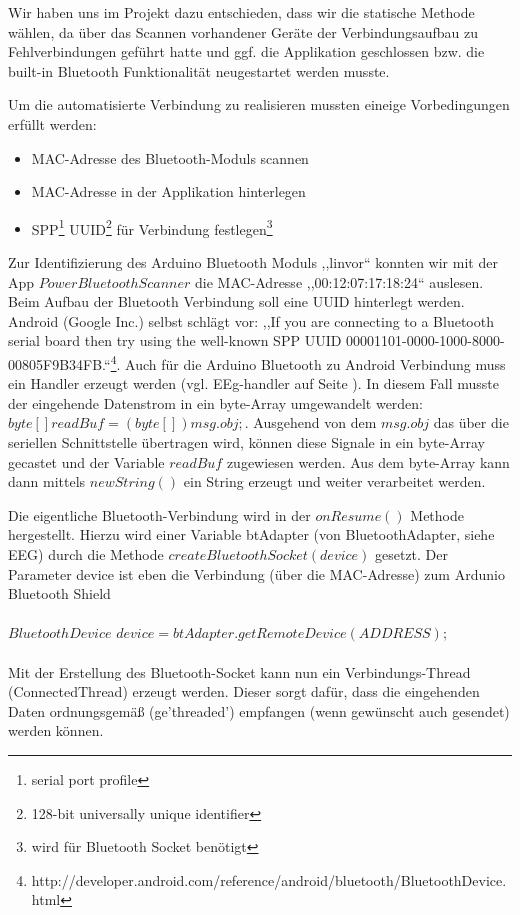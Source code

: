 \documentclass[10pt, a4paper, oneside, titlepage]{scrartcl} %
\begin{document}
	Wir haben uns im Projekt dazu entschieden, dass wir die statische Methode wählen, da über das Scannen vorhandener Geräte der Verbindungsaufbau zu Fehlverbindungen geführt hatte und ggf. die Applikation geschlossen bzw. die built-in Bluetooth Funktionalität neugestartet werden musste. 
	
	Um die automatisierte Verbindung zu realisieren mussten eineige Vorbedingungen erfüllt werden:
	\begin{itemize}
	\item MAC-Adresse des Bluetooth-Moduls scannen
	\item MAC-Adresse in der Applikation hinterlegen
	\item SPP\footnote{serial port profile} UUID\footnote{128-bit universally unique identifier} für Verbindung festlegen\footnote{wird für Bluetooth Socket benötigt}
	\end{itemize}
	
	Zur Identifizierung des Arduino Bluetooth Moduls ,,linvor`` konnten wir mit der App $Power Bluetooth Scanner$ die MAC-Adresse ,,00:12:07:17:18:24`` auslesen. 
	Beim Aufbau der Bluetooth Verbindung soll eine UUID hinterlegt werden. Android (Google Inc.) selbst schlägt vor: ,,If you are connecting to a Bluetooth serial board then try using the well-known SPP UUID 00001101-0000-1000-8000-00805F9B34FB.``\footnote{http://developer.android.com/reference/android/bluetooth/BluetoothDevice.html}. 
	Auch für die Arduino Bluetooth zu Android Verbindung muss ein Handler erzeugt werden (vgl. EEg-handler auf Seite \pageref{handler}).
	In diesem Fall musste der eingehende Datenstrom in ein byte-Array umgewandelt werden: $byte[] readBuf = (byte[]) msg.obj;$. Ausgehend von dem $msg.obj$ das über die seriellen Schnittstelle übertragen wird, können diese Signale in ein byte-Array gecastet und der Variable $readBuf$ zugewiesen werden. Aus dem byte-Array kann dann mittels $new String()$ ein String erzeugt und weiter verarbeitet werden.
	
	Die eigentliche Bluetooth-Verbindung wird in der $onResume()$ Methode hergestellt. Hierzu wird einer Variable btAdapter (von BluetoothAdapter, siehe EEG) durch die Methode $create BluetoothSocket(device)$ gesetzt. 
	Der Parameter device ist eben die Verbindung (über die MAC-Adresse) zum Ardunio Bluetooth Shield \\ \\
	$BluetoothDevice$ $device = btAdapter.getRemoteDevice(ADDRESS);$\\ \\
	Mit der Erstellung des Bluetooth-Socket kann nun ein Verbindungs-Thread (ConnectedThread) erzeugt werden. Dieser sorgt dafür, dass die eingehenden Daten ordnungsgemäß (ge'threaded') empfangen (wenn gewünscht auch gesendet) werden können. 
	
\end{document}
